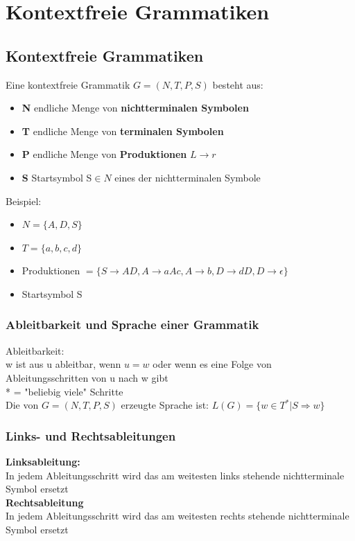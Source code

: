 \documentclass{scrreprt}
\begin{document}
\chapter{Kontextfreie Grammatiken}
\section{Kontextfreie Grammatiken}
Eine kontextfreie Grammatik $G=(N,T,P,S)$ besteht aus:
\begin{itemize}
    \item \textbf{N} endliche Menge von \textbf{nichtterminalen Symbolen}
    \item \textbf{T} endliche Menge von \textbf{terminalen Symbolen}
    \item \textbf{P} endliche Menge von \textbf{Produktionen} $L \rightarrow r$
    \item \textbf{S} Startsymbol S$\in N$ eines der nichtterminalen Symbole
\end{itemize}
Beispiel:
\begin{itemize}
    \item $N = \{A,D,S\}$
    \item $T=\{a,b,c,d\}$
    \item Produktionen $=\{S \rightarrow AD, A \rightarrow aAc, A \rightarrow b, D \rightarrow dD, D \rightarrow \epsilon\}$
    \item Startsymbol S
\end{itemize}
\subsection{Ableitbarkeit und Sprache einer Grammatik}
Ableitbarkeit:
\\w ist aus u ableitbar, wenn $u=w$ oder wenn es eine Folge von Ableitungsschritten von u nach w gibt
\\ * = "beliebig viele" Schritte
\\Die von $G=(N,T,P,S)$ erzeugte Sprache ist: $L(G)=\{w \in T^{*} | S \Rightarrow w\}$
\subsection{Links- und Rechtsableitungen}
\textbf{Linksableitung:}
\\In jedem Ableitungsschritt wird das am weitesten links stehende nichtterminale Symbol ersetzt
\\\textbf{Rechtsableitung}
\\In jedem Ableitungsschritt wird das am weitesten rechts stehende nichtterminale Symbol ersetzt
\end{document}
